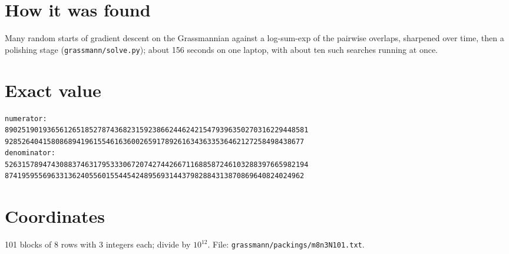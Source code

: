 \documentclass[11pt,a4paper]{article}
\begin{document}
\section{How it was found}
Many random starts of gradient descent on the Grassmannian against a log-sum-exp of the pairwise overlaps, sharpened over time, then a polishing stage (\texttt{grassmann/solve.py}); about 156 seconds on one laptop, with about ten such searches running at once.


\appendix
\section{Exact value}
{\small
\begin{verbatim}
numerator:
890251901936561265185278743682315923866244624215479396350270316229448581
92852640415808689419615546163600265917892616343633536462127258498438677
denominator:
526315789474308837463179533306720742744266711688587246103288397665982194
87419595569633136240556015544542489569314437982884313870869640824024962
\end{verbatim}}

\section{Coordinates}
101 blocks of 8 rows with 3 integers each; divide by $10^{12}$. File: \texttt{grassmann/packings/m8n3N101.txt}.
{\tiny
\begin{multicols}{3}
\end{multicols}}
\end{document}
